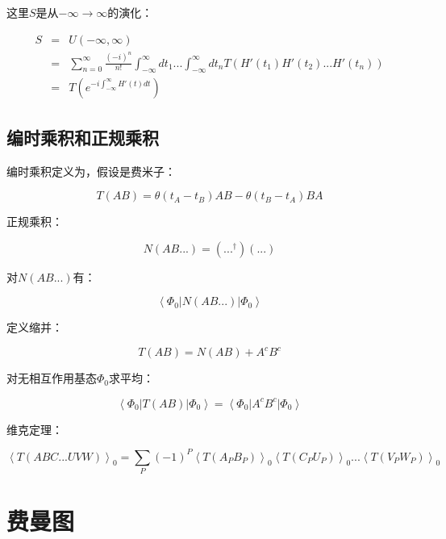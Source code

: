 这里$S$是从$- \infty \to \infty$的演化：

\begin{eqnarray*}
S & = & U(-\infty, \infty) \\
{} & = & \sum\limits_{n=0}^{\infty}  \frac{(-i)^n}{n!} \int_{-\infty}^{\infty} dt_1 ... \int_{-\infty}^{\infty} dt_n  T \left(  H'(t_1) H'(t_2) ... H'(t_n)  \right) \\
{} & = & T \left( e^{-i \int_{-\infty}^{\infty} H'(t)dt  }  \right)
\end{eqnarray*}


\subsection{编时乘积和正规乘积}

编时乘积定义为，假设是费米子：

\begin{equation}
T(AB) = \theta(t_A - t_B) AB - \theta(t_B - t_A) BA
\end{equation}

正规乘积：

\begin{equation}
N(AB...) = (...^\dagger)(...)
\end{equation}

对$N(AB...)$有：

\begin{equation*}
\left\langle \Phi_0 \right| N(AB...) \left| \Phi_0 \right\rangle
\end{equation*}

定义缩并：

\begin{equation}
T(AB)  = N(AB) + A^cB^c
\end{equation}

对无相互作用基态$\Phi_0$求平均：

\begin{equation}
\left\langle \Phi_0 \right| T(AB) \left| \Phi_0 \right\rangle = \left\langle \Phi_0 \right| A^c B^c \left| \Phi_0 \right\rangle
\end{equation}

维克定理：

\begin{equation}
\left\langle T(ABC...UVW) \right\rangle_0 = \sum\limits_{P} (-1)^P \left\langle T(A_P B_P)  \right\rangle_0 \left\langle T(C_P U_P) \right\rangle_0 ...  \left\langle T(V_P W_P) \right\rangle_0
\end{equation}


\section{费曼图}


